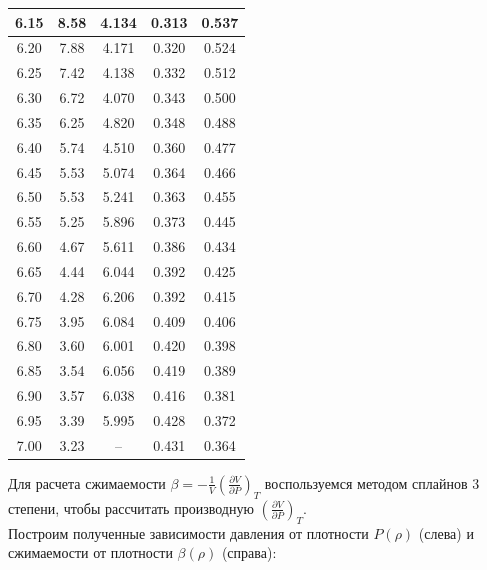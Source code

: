 \begin{center}
\begin{tabular}{|c|c|c|c|c|}
\hline
6.15 &8.58 &4.134 &0.313  &0.537 \\
\hline
6.20 &7.88  &4.171  & 0.320 & 0.524\\
\hline
6.25 &7.42 &4.138 &0.332  &0.512 \\
\hline
6.30 &6.72 &4.070 &0.343  &0.500 \\
\hline
6.35 &6.25 &4.820 &0.348  &0.488 \\
\hline
6.40 &5.74 &4.510 &0.360  &0.477 \\
\hline
6.45 &5.53 &5.074 &0.364  &0.466 \\
\hline
6.50 &5.53 &5.241 &0.363  &0.455 \\
\hline
6.55 &5.25 &5.896 &0.373 &0.445 \\
\hline
6.60 &4.67 &5.611 &0.386  &0.434 \\
\hline
6.65 &4.44 &6.044 &0.392  &0.425 \\
\hline
6.70 &4.28 &6.206 &0.392& 0.415\\
\hline
6.75 &3.95 &6.084 &0.409 &0.406 \\
\hline
6.80 &3.60 &6.001 &0.420 &0.398 \\
\hline
6.85 &3.54 &6.056 &0.419  &0.389 \\
\hline
6.90 &3.57 &6.038 &0.416  &0.381 \\
\hline
6.95 &3.39 &5.995 &0.428  &0.372 \\
\hline
7.00 &3.23 & -- &0.431  & 0.364\\
\hline
\end{tabular}
\end{center}


\newpage

Для расчета сжимаемости $\beta = -\frac{1}{V}\left(\frac{\partial V}{\partial P} \right)_T$ воспользуемся методом сплайнов 3 степени, чтобы рассчитать производную $\left(\frac{\partial V}{\partial P} \right)_T$. \\



Построим полученные зависимости давления от плотности $P(\rho)$ (слева) и сжимаемости от плотности $\beta(\rho)$ (справа):\\

\newline

